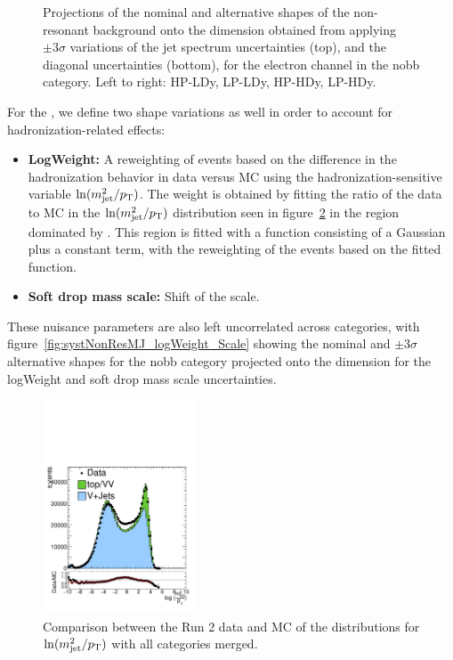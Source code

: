 \begin{figure}[htbp]
  \caption{
    Projections of the nominal and alternative shapes of the non-resonant background onto the \MVV dimension obtained from applying $\pm3\sigma$ variations of the jet \pt spectrum uncertainties (top), and the diagonal uncertainties (bottom), for the electron channel in the nobb category.
    Left to right: HP-LDy, LP-LDy, HP-HDy, LP-HDy.
  }
  \label{fig:systNonResMVV_MVVScale_Diag}
\end{figure}

For the \MJ, we define two shape variations as well in order to account for hadronization-related effects:
\begin{itemize}
  \item {\bfseries LogWeight:} A reweighting of events based on the difference in the hadronization behavior in data versus MC using the hadronization-sensitive variable $\ln(m_\mathrm{jet}^2/p_\mathrm{T})$.
  The weight is obtained by fitting the ratio of the data to MC in the $\ln(m_\mathrm{jet}^2/p_\mathrm{T})$ distribution seen in figure~\ref{fig:logWeight} in the region dominated by \Wjets.
  This region is fitted with a function consisting of a Gaussian plus a constant term, with the reweighting of the events based on the fitted function.
  \item {\bfseries Soft drop mass scale:} Shift of the \MJ scale.
\end{itemize}
These nuisance parameters are also left uncorrelated across categories, with figure~\ref{fig:systNonResMJ_logWeight_Scale} showing the nominal and $\pm3\sigma$ alternative shapes for the nobb category projected onto the \MJ dimension for the logWeight and soft drop mass scale uncertainties.

\begin{figure}[htbp]
  \centering
  \includegraphics[width=0.4\textwidth]{fig/uncertainties/logWeight.pdf}
  \caption{
    Comparison between the Run 2 data and MC of the distributions for $\ln(m_\mathrm{jet}^2/p_\mathrm{T})$ with all categories merged.
  }
  \label{fig:logWeight}
\end{figure}

